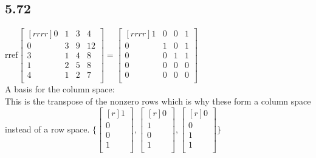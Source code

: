 \documentclass{report}
\theoremstyle{plain}
\theoremstyle{definition}
\theoremstyle{plain}
\begin{document}
\subsection{5.72}
$\mathrm{rref}\begin{bmatrix}[rrrr]0&1&3&4\\0&3&9&12\\3&1&4&8\\1&2&5&8\\4&1&2&7\\\end{bmatrix} = \begin{bmatrix}[rrrr]1&0&0&1\\0&1&0&1\\0&0&1&1\\0&0&0&0\\0&0&0&0\\\end{bmatrix}$\\
A basis for the column space:\\
This is the transpose of the nonzero rows which is why these form a column space instead of a row space.
$\{\begin{bmatrix}[r]1\\0\\0\\1\\\end{bmatrix},\begin{bmatrix}[r]0\\1\\0\\1\\\end{bmatrix},\begin{bmatrix}[r]0\\0\\1\\1\\\end{bmatrix}\}$
\end{document}
